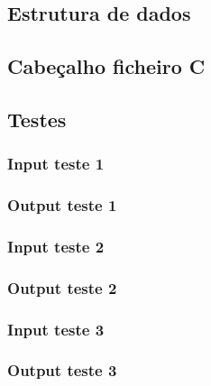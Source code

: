 \subsection{Estrutura de dados}
\label{seq:anex-music-est}


\subsection{Cabeçalho ficheiro C}
\label{seq:anex-music-header}


\subsection{Testes}
\label{seq:anex-music-tests}
\subsubsection{Input teste 1}
\label{seq:anex-music-test-in01}


\subsubsection{Output teste 1}
\label{seq:anex-music-test-out01}


\subsubsection{Input teste 2}
\label{seq:anex-music-test-in02}


\subsubsection{Output teste 2}
\label{seq:anex-music-test-out02}


\subsubsection{Input teste 3}
\label{seq:anex-music-test-in03}


\subsubsection{Output teste 3}
\label{seq:anex-music-test-out03}


